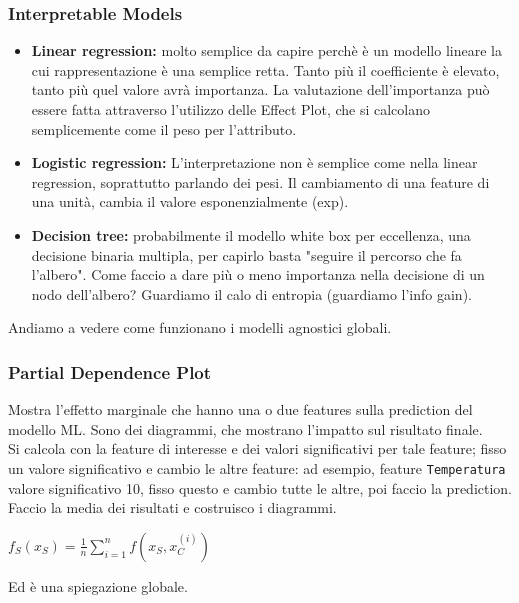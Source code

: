 \subsubsection{Interpretable Models}
\begin{itemize}
    \item \textbf{Linear regression:} molto semplice da capire perchè è un modello lineare la cui rappresentazione è una semplice retta. Tanto più il coefficiente è elevato, tanto più quel valore avrà importanza. La valutazione dell'importanza può essere fatta attraverso l'utilizzo delle Effect Plot, che si calcolano semplicemente come il peso per l'attributo. 
    \item \textbf{Logistic regression:} L'interpretazione non è semplice come nella linear regression, soprattutto parlando dei pesi. Il cambiamento di una feature di una unità, cambia il valore esponenzialmente (exp). 
    \item \textbf{Decision tree:} probabilmente il modello white box per eccellenza, una decisione binaria multipla, per capirlo basta "seguire il percorso che fa l'albero". Come faccio a dare più o meno importanza nella decisione di un nodo dell'albero? Guardiamo il calo di entropia (guardiamo l'info gain). 
\end{itemize}
Andiamo a vedere come funzionano i modelli agnostici globali. 

\newpage

\subsubsection{Partial Dependence Plot}
Mostra l'effetto marginale che hanno una o due features sulla prediction del modello ML. Sono dei diagrammi, che mostrano l'impatto sul risultato finale. 
\\
Si calcola con la feature di interesse e dei valori significativi per tale feature; fisso un valore significativo e cambio le altre feature: ad esempio, feature \texttt{Temperatura} valore significativo 10, fisso questo e cambio tutte le altre, poi faccio la prediction. Faccio la media dei risultati e costruisco i diagrammi. 
\begin{center}
    \begin{math}
        f_{S}(x_S) = \frac{1}{n} \sum_{i=1}^{n} f(x_S, x_C^{(i)})
    \end{math}
\end{center}
Ed è una spiegazione globale.

